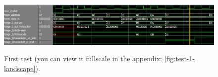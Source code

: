 \begin{figure}[H]
	\caption{First test (you can view it fullscale in the appendix:
\ref{fig:test-1-landscape}).}
	\includegraphics[scale=0.6]{figures/test_1_text.png}
	\label{fig:test-1-text}
\end{figure}
